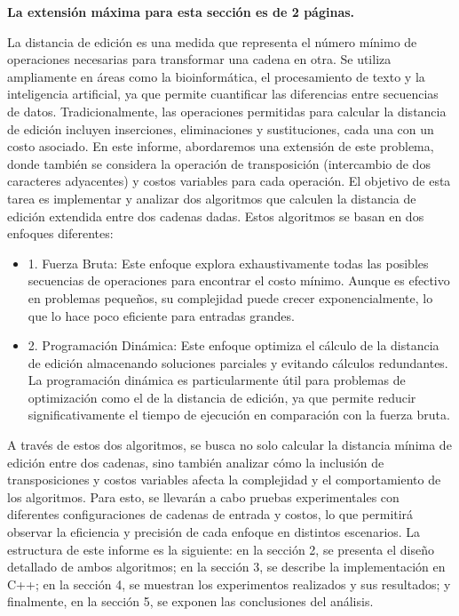 \begin{mdframed}
    \textbf{La extensión máxima para esta sección es de 2 páginas.}
\end{mdframed}

La distancia de edición es una medida que representa el número mínimo de operaciones necesarias para transformar una cadena en otra. Se utiliza ampliamente en áreas como la bioinformática, el procesamiento de texto y la inteligencia artificial, ya que permite cuantificar las diferencias entre secuencias de datos. Tradicionalmente, las operaciones permitidas para calcular la distancia de edición incluyen inserciones, eliminaciones y sustituciones, cada una con un costo asociado. En este informe, abordaremos una extensión de este problema, donde también se considera la operación de transposición (intercambio de dos caracteres adyacentes) y costos variables para cada operación.
El objetivo de esta tarea es implementar y analizar dos algoritmos que calculen la distancia de edición extendida entre dos cadenas dadas. Estos algoritmos se basan en dos enfoques diferentes:
\begin{itemize}
\item1.	Fuerza Bruta: Este enfoque explora exhaustivamente todas las posibles secuencias de operaciones para encontrar el costo mínimo. Aunque es efectivo en problemas pequeños, su complejidad puede crecer exponencialmente, lo que lo hace poco eficiente para entradas grandes.
\item2.	Programación Dinámica: Este enfoque optimiza el cálculo de la distancia de edición almacenando soluciones parciales y evitando cálculos redundantes. La programación dinámica es particularmente útil para problemas de optimización como el de la distancia de edición, ya que permite reducir significativamente el tiempo de ejecución en comparación con la fuerza bruta.
\end{itemize}
A través de estos dos algoritmos, se busca no solo calcular la distancia mínima de edición entre dos cadenas, sino también analizar cómo la inclusión de transposiciones y costos variables afecta la complejidad y el comportamiento de los algoritmos. Para esto, se llevarán a cabo pruebas experimentales con diferentes configuraciones de cadenas de entrada y costos, lo que permitirá observar la eficiencia y precisión de cada enfoque en distintos escenarios.
La estructura de este informe es la siguiente: en la sección 2, se presenta el diseño detallado de ambos algoritmos; en la sección 3, se describe la implementación en C++; en la sección 4, se muestran los experimentos realizados y sus resultados; y finalmente, en la sección 5, se exponen las conclusiones del análisis.

